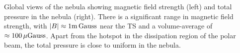 Global views of the nebula showing magnetic field strength (left) and total pressure in the nebula (right).  There is a significant range in magnetic field strength, with $|B|\approx1\rm m\, Gauss$ near the TS and a volume-average of $\approx 100\, \mu\rm Gauss$.  Apart from the hotspot in the dissipation region of the polar beam, the total pressure is close to uniform in the nebula.